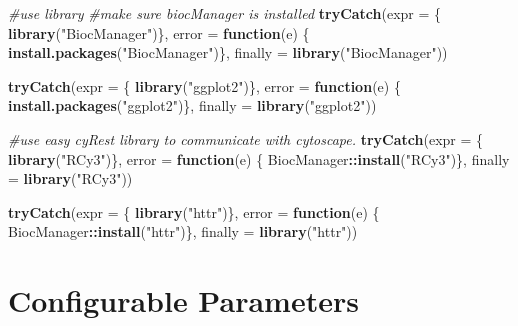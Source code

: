 \documentclass[
]{book}
\newenvironment{Shaded}{\begin{snugshade}}{\end{snugshade}}
\newcommand{\AttributeTok}[1]{\textcolor[rgb]{0.13,0.29,0.53}{#1}}
\newcommand{\CommentTok}[1]{\textcolor[rgb]{0.56,0.35,0.01}{\textit{#1}}}
\newcommand{\ControlFlowTok}[1]{\textcolor[rgb]{0.13,0.29,0.53}{\textbf{#1}}}
\newcommand{\FunctionTok}[1]{\textcolor[rgb]{0.13,0.29,0.53}{\textbf{#1}}}
\newcommand{\NormalTok}[1]{#1}
\newcommand{\SpecialCharTok}[1]{\textcolor[rgb]{0.81,0.36,0.00}{\textbf{#1}}}
\newcommand{\StringTok}[1]{\textcolor[rgb]{0.31,0.60,0.02}{#1}}
\begin{document}
\begin{Shaded}
\begin{Highlighting}[]
\CommentTok{\#use library}
\CommentTok{\#make sure biocManager is installed}
\FunctionTok{tryCatch}\NormalTok{(}\AttributeTok{expr =}\NormalTok{ \{ }\FunctionTok{library}\NormalTok{(}\StringTok{"BiocManager"}\NormalTok{)\}, }
         \AttributeTok{error =} \ControlFlowTok{function}\NormalTok{(e) \{ }
           \FunctionTok{install.packages}\NormalTok{(}\StringTok{"BiocManager"}\NormalTok{)\}, }
         \AttributeTok{finally =} \FunctionTok{library}\NormalTok{(}\StringTok{"BiocManager"}\NormalTok{))}

\FunctionTok{tryCatch}\NormalTok{(}\AttributeTok{expr =}\NormalTok{ \{ }\FunctionTok{library}\NormalTok{(}\StringTok{"ggplot2"}\NormalTok{)\}, }
         \AttributeTok{error =} \ControlFlowTok{function}\NormalTok{(e) \{ }\FunctionTok{install.packages}\NormalTok{(}\StringTok{"ggplot2"}\NormalTok{)\}, }
         \AttributeTok{finally =} \FunctionTok{library}\NormalTok{(}\StringTok{"ggplot2"}\NormalTok{))}

\CommentTok{\#use easy cyRest library to communicate with cytoscape.}
\FunctionTok{tryCatch}\NormalTok{(}\AttributeTok{expr =}\NormalTok{ \{ }\FunctionTok{library}\NormalTok{(}\StringTok{"RCy3"}\NormalTok{)\}, }
         \AttributeTok{error =} \ControlFlowTok{function}\NormalTok{(e) \{ BiocManager}\SpecialCharTok{::}\FunctionTok{install}\NormalTok{(}\StringTok{"RCy3"}\NormalTok{)\}, }
         \AttributeTok{finally =} \FunctionTok{library}\NormalTok{(}\StringTok{"RCy3"}\NormalTok{))}

\FunctionTok{tryCatch}\NormalTok{(}\AttributeTok{expr =}\NormalTok{ \{ }\FunctionTok{library}\NormalTok{(}\StringTok{"httr"}\NormalTok{)\}, }
         \AttributeTok{error =} \ControlFlowTok{function}\NormalTok{(e) \{ BiocManager}\SpecialCharTok{::}\FunctionTok{install}\NormalTok{(}\StringTok{"httr"}\NormalTok{)\}, }
         \AttributeTok{finally =} \FunctionTok{library}\NormalTok{(}\StringTok{"httr"}\NormalTok{))}
\end{Highlighting}
\end{Shaded}

\section{Configurable Parameters}\label{configurable-parameters-1}
\end{document}
